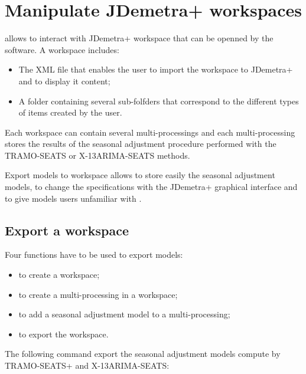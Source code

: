 \documentclass[article]{jss}
\providecommand{\tightlist}{%
  \setlength{\itemsep}{0pt}\setlength{\parskip}{0pt}}
\begin{document}
\hypertarget{manipulate-workspace}{%
\section{Manipulate JDemetra+ workspaces}\label{manipulate-workspace}}

 allows to interact with JDemetra+ workspace that can be
openned by the software. A workspace includes:

\begin{itemize}
\tightlist
\item
  The XML file that enables the user to import the workspace to
  JDemetra+ and to display it content;\\
\item
  A folder containing several sub-folfders that correspond to the
  different types of items created by the user.
\end{itemize}

Each workspace can contain several multi-processings and each
multi-processing stores the results of the seasonal adjustment procedure
performed with the TRAMO-SEATS or X-13ARIMA-SEATS methods.

Export models to workspace allows to store easily the seasonal
adjustment models, to change the specifications with the JDemetra+
graphical interface and to give models users unfamiliar with
.

\hypertarget{export-wk}{%
\subsection{Export a workspace}\label{export-wk}}

Four functions have to be used to export models:

\begin{itemize}
\tightlist
\item
   to create a workspace;\\
\item
   to create a multi-processing in a
  workspace;\\
\item
   to add a seasonal adjustment model to a
  multi-processing;\\
\item
   to export the workspace.
\end{itemize}

The following command export the seasonal adjustment models compute by
TRAMO-SEATS+ and X-13ARIMA-SEATS:
\end{document}
